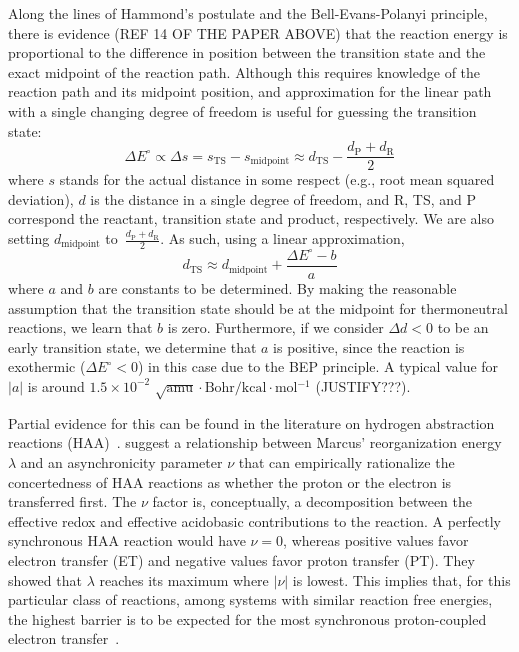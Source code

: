 Along the lines of Hammond's postulate and the Bell-Evans-Polanyi principle,
there is evidence (REF 14 OF THE PAPER ABOVE) that the reaction energy is
proportional to the difference in position between the transition state and the
exact midpoint of the reaction path.
Although this requires knowledge of the reaction path and its midpoint
position, and approximation for the linear path with a single changing degree
of freedom is useful for guessing the transition state:
%
\begin{equation}
    \Delta E^\circ \propto \Delta s
        = s_\text{TS} - s_\text{midpoint}
        \approx d_\text{TS} - \frac{d_\text{P} + d_\text{R}}{2}
\end{equation}
%
where $s$ stands for the actual distance in some respect (e.g., root mean
squared deviation), $d$ is the distance in a single degree of freedom, and R,
TS, and P correspond the reactant, transition state and product, respectively.
We are also setting $d_\text{midpoint}$
to~$\frac{d_\text{P} + d_\text{R}}{2}$.
As such, using a linear approximation,
%
\begin{equation}
    d_\text{TS}
    \approx d_\text{midpoint} + \frac{\Delta E^\circ - b}{a}
\end{equation}
%
where $a$ and $b$ are constants to be determined.
By making the reasonable assumption that the transition state should be at the
midpoint for thermoneutral reactions, we learn that $b$ is zero.
Furthermore, if we consider $\Delta d < 0$ to be an early transition state, we
determine that $a$ is positive, since the reaction is exothermic
($\Delta E^\circ < 0$) in this case due to the BEP principle.
A typical value for $|a|$ is around
$1.5 \times 10^{-2}$
$\sqrt{\text{amu}}\cdot\text{Bohr} / \text{kcal$\cdot$mol$^{-1}$}$
(JUSTIFY???).

Partial evidence for this can be found in the literature on hydrogen
abstraction reactions (HAA)~\cite{Bim2018}.
\citeauthor{Bim2018} suggest a relationship between Marcus' reorganization
energy $\lambda$ and an asynchronicity parameter $\nu$ that can empirically
rationalize the concertedness of HAA reactions as whether the proton or the
electron is transferred first.
The $\nu$ factor is, conceptually, a decomposition between the effective redox
and effective acidobasic contributions to the reaction.
A perfectly synchronous HAA reaction would have $\nu = 0$, whereas positive
values favor electron transfer (ET) and negative values favor proton transfer
(PT).
They showed that $\lambda$ reaches its maximum where $|\nu|$ is lowest.
This implies that, for this particular class of reactions, among systems with
similar reaction free energies, the highest barrier is to be expected for the
most synchronous proton-coupled electron transfer~\cite{Bim2018}.

